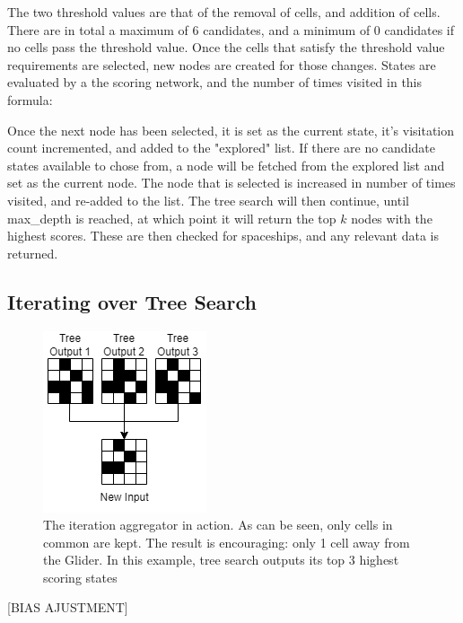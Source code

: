 \documentclass{l4proj}
\begin{document}
The two threshold values are that of the removal of cells, and addition of cells. There are in total a maximum of 6 candidates, and a minimum of 0 candidates if no cells pass the threshold value. Once the cells that satisfy the threshold value requirements are selected, new nodes are created for those changes. States are evaluated by a the scoring network, and the number of times visited in this formula:
 
Once the next node has been selected, it is set as the current state, it's visitation count incremented, and added to the "explored" list. If there are no candidate states available to chose from, a node will be fetched from the explored list and set as the current node. The node that is selected is increased in number of times visited, and re-added to the list. The tree search will then continue, until max\_depth is reached, at which point it will return the top $k$ nodes with the highest scores. These are then checked for spaceships, and any relevant data is returned.

\subsection{Iterating over Tree Search}

\begin{figure}[h!]
\centering
\includegraphics[width=0.4\linewidth]{dissertation/images/diagrams/iteration_aggregator.png}
\caption{The iteration aggregator in action. As can be seen, only cells in common are kept. The result is encouraging: only 1 cell away from the Glider. In this example, tree search outputs its top 3 highest scoring states}
\label{fig:subim1}
\end{figure}

[BIAS AJUSTMENT]
\end{document}
